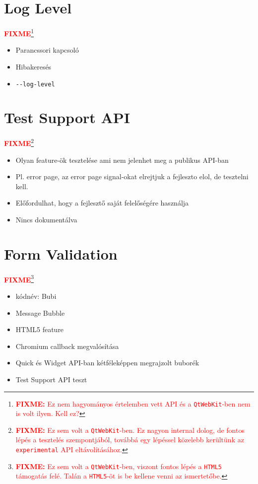 \documentclass[12pt]{report}
\newcommand{\fixme}[1]{%
    \textcolor{red}{\textbf{FIXME}}\footnote{\textcolor{red}{\textbf{FIXME:} #1}}
}
\begin{document}
\section{Log Level}
\fixme{Ez nem hagyományos értelemben vett API és a \texttt{QtWebKit}-ben nem is volt ilyen.
Kell ez?}
\begin{itemize}
    \item Parancssori kapcsoló
    \item Hibakeresés
    \item \texttt{-{}-log-level}
\end{itemize}
\pagebreak

\section{Test Support API}
\fixme{Ez sem volt a \texttt{QtWebKit}-ben. Ez nagyon internal dolog, de fontos lépés a
tesztelés szempontjából, továbbá egy lépéssel közelebb kerültünk az \texttt{experimental}
API eltávolításához.}
\begin{itemize}
    \item Olyan feature-ök tesztelése ami nem jelenhet meg a publikus API-ban
    \item Pl. error page, az error page signal-okat elrejtjuk a fejleszto elol, de tesztelni
        kell.
    \item Előfordulhat, hogy a fejlesztő saját felelőségére használja
    \item Nincs dokumentálva
\end{itemize}
\pagebreak

\section{Form Validation}
\fixme{Ez sem volt a \texttt{QtWebKit}-ben, viszont fontos lépés a \texttt{HTML5} támogatás
felé. Talán a \texttt{HTML5}-öt is be kellene venni az ismertetőbe.}
\begin{itemize}
    \item kódnév: Bubi
    \item Message Bubble
    \item HTML5 feature
    \item Chromium callback megvalósítása
    \item Quick és Widget API-ban kétféleképpen megrajzolt buborék
    \item Test Support API teszt
\end{itemize}
\pagebreak
\end{document}
